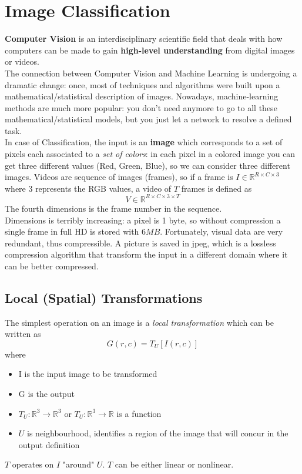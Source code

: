 \section{Image Classification}
\textbf{Computer Vision} is an interdisciplinary scientific field that deals with how computers can be made to gain \textbf{high-level understanding} from digital images or videos. \\
The connection between Computer Vision and Machine Learning is undergoing a dramatic change: once, most of techniques and algorithms were built upon a mathematical/statistical description of images. Nowadays, machine-learning methods are much more popular: you don't need anymore to go to all these mathematical/statistical models, but you just let a network to resolve a defined task. \\
In case of Classification, the input is an \textbf{image} which corresponds to a set of pixels each associated to a \textit{set of colors}: in each pixel in a colored image you can get three different values (Red, Green, Blue), so we can consider three different images. Videos are sequence of images (frames), so if a frame is $ I \in \mathbb{R}^{R \times C \times 3} $ where 3 represents the RGB values, a video of $T$ frames is defined as
$$
V \in \mathbb{R}^{R \times C \times 3 \times T}
$$
The fourth dimensions is the frame number in the sequence. \\
Dimensions is terribly increasing: a pixel is 1 byte, so without compression a single frame in full HD is stored with $6MB$. Fortunately, visual data are very redundant, thus compressible. A picture is saved in jpeg, which is a lossless compression algorithm that transform the input in a different domain where it can be better compressed. \\

\subsection{Local (Spatial) Transformations}
The simplest operation on an image is a \textit{local transformation} which can be written as $$ G(r,c) = T_U[I(r,c)]
$$
where
\begin{itemize}
    \item I is the input image to be transformed
    \item G is the output
    \item $T_U: \mathbb{R}^3 \rightarrow \mathbb{R}^3$ or  $T_U: \mathbb{R}^3 \rightarrow \mathbb{R}$ is a function
    \item $U$ is neighbourhood, identifies a region of the image that will concur in the output definition
\end{itemize}{}
$T$ operates on $I$ "around" $U$. $T$ can be either linear or nonlinear.\\

